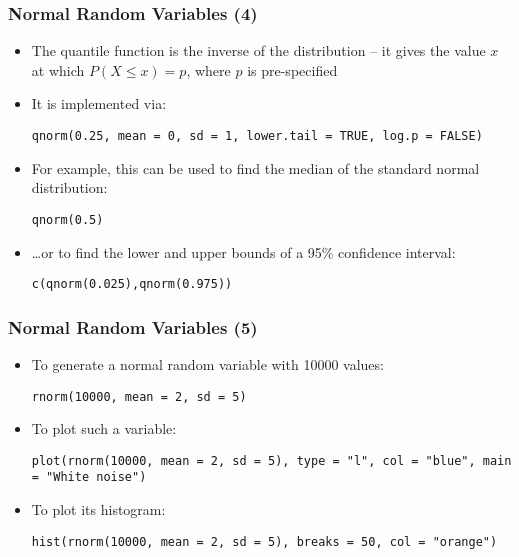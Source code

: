 \documentclass[10pt]{beamer}
\theoremstyle{definition}
\begin{document}
\begin{frame}[fragile]
\frametitle{Normal Random Variables (4)}
\begin{itemize}
	\item The quantile function is the inverse of the distribution -- it gives the value $x$ at which $P(X\leq x) = p$, where $p$ is pre-specified
	
	\item It is implemented via:
	\begin{lstlisting}[style = rstyle, breaklines]
	qnorm(0.25, mean = 0, sd = 1, lower.tail = TRUE, log.p = FALSE)
	\end{lstlisting}
	
	\item For example, this can be used to find the median of the standard normal distribution:
	\begin{lstlisting}[style = rstyle, breaklines]
	qnorm(0.5)
	\end{lstlisting}
	\item \ldots or to find the lower and upper bounds of a 95\% confidence interval:
	\begin{lstlisting}[style = rstyle, breaklines]
	c(qnorm(0.025),qnorm(0.975))
	\end{lstlisting}
\end{itemize}
\end{frame}

\begin{frame}[fragile]
\frametitle{Normal Random Variables (5)}
\begin{itemize}
	\item To generate a normal random variable with 10000 values:
	\begin{lstlisting}[style = rstyle, breaklines]
	rnorm(10000, mean = 2, sd = 5)
	\end{lstlisting}
	
	\item To plot such a variable:
	\begin{lstlisting}[style = rstyle, breaklines]
	plot(rnorm(10000, mean = 2, sd = 5), type = "l", col = "blue", main = "White noise")
	\end{lstlisting}
	
	\item To plot its histogram:
	\begin{lstlisting}[style = rstyle, breaklines]
	hist(rnorm(10000, mean = 2, sd = 5), breaks = 50, col = "orange")
	\end{lstlisting}
\end{itemize}
\end{frame} 
\end{document}
